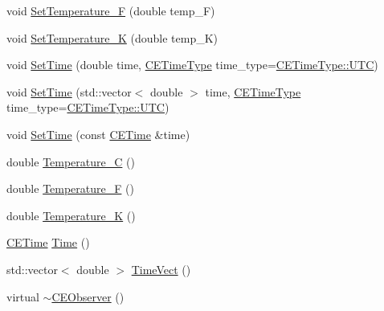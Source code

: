 \begin{DoxyCompactItemize}
\item 
void \hyperlink{class_c_e_observer_a4a152fd4044cd63b4b28131035def02d}{Set\+Temperature\+\_\+\+F} (double temp\+\_\+\+F)
\item 
void \hyperlink{class_c_e_observer_ab917e7c63bb9bef866e34d534fde7d5c}{Set\+Temperature\+\_\+\+K} (double temp\+\_\+\+K)
\item 
void \hyperlink{class_c_e_observer_a2f25b5a0e90d3dddbf8f571c9fda6d54}{Set\+Time} (double time, \hyperlink{_c_e_time_8h_ab50b2d3a782e5eea768b25bfb3d7e65f}{C\+E\+Time\+Type} time\+\_\+type=\hyperlink{_c_e_time_8h_ab50b2d3a782e5eea768b25bfb3d7e65fa2c56d07da8a08a92de9453a00e31d55d}{C\+E\+Time\+Type\+::\+U\+T\+C})
\item 
void \hyperlink{class_c_e_observer_ae86c248f4aa22ab26b52a5d7f7a060dd}{Set\+Time} (std\+::vector$<$ double $>$ time, \hyperlink{_c_e_time_8h_ab50b2d3a782e5eea768b25bfb3d7e65f}{C\+E\+Time\+Type} time\+\_\+type=\hyperlink{_c_e_time_8h_ab50b2d3a782e5eea768b25bfb3d7e65fa2c56d07da8a08a92de9453a00e31d55d}{C\+E\+Time\+Type\+::\+U\+T\+C})
\item 
void \hyperlink{class_c_e_observer_ac01ca4941f77103eeae169c7672f128b}{Set\+Time} (const \hyperlink{class_c_e_time}{C\+E\+Time} \&time)
\item 
double \hyperlink{class_c_e_observer_a750ca767ac507ba51f7e2883323032b4}{Temperature\+\_\+\+C} ()
\item 
double \hyperlink{class_c_e_observer_ac4aa1461ce385ea5177f959b6a78fe3b}{Temperature\+\_\+\+F} ()
\item 
double \hyperlink{class_c_e_observer_ab2294f0c9ce713f0fbb232065460a05b}{Temperature\+\_\+\+K} ()
\item 
\hyperlink{class_c_e_time}{C\+E\+Time} \hyperlink{class_c_e_observer_a6511c311183f0c4e1a8556bc4350250e}{Time} ()
\item 
std\+::vector$<$ double $>$ \hyperlink{class_c_e_observer_a16c5923d2f161689faeaf276942cb7c6}{Time\+Vect} ()
\item 
virtual \hyperlink{class_c_e_observer_a3c8b8910cafadf1f57be6dc0e7878e80}{$\sim$\+C\+E\+Observer} ()
\end{DoxyCompactItemize}
